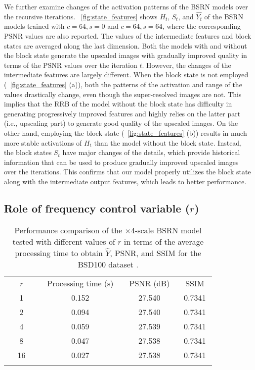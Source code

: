 \documentclass[runningheads]{llncs}
\begin{document}
We further examine changes of the activation patterns of the BSRN models over the recursive iterations.
\figurename~\ref{fig:state_features} shows ${H}_{t}$, ${S}_{t}$, and $\widehat{{Y}_{t}}$ of the BSRN models trained with $c=64, s=0$ and $c=64, s=64$, where the corresponding PSNR values are also reported.
The values of the intermediate features and block states are averaged along the last dimension.
Both the models with and without the block state generate the upscaled images with gradually improved quality in terms of the PSNR values over the iteration $t$.
However, the changes of the intermediate features are largely different.
When the block state is not employed (\figurename~\ref{fig:state_features} (a)), both the patterns of the activation and range of the values drastically change, even though the super-resolved images are not.
This implies that the RRB of the model without the block state has difficulty in generating progressively improved features and highly relies on the latter part (i.e., upscaling part) to generate good quality of the upscaled images.
On the other hand, employing the block state (\figurename~\ref{fig:state_features} (b)) results in much more stable activations of ${H}_{t}$ than the model without the block state.
Instead, the block states ${S}_{t}$ have major changes of the details, which provide historical information that can be used to produce gradually improved upscaled images over the iterations.
This confirms that our model properly utilizes the block state along with the intermediate output features, which leads to better performance.


\subsection{Role of frequency control variable ($r$)}
\label{sec:r_role}

\begin{table}[t]
	\scriptsize
	\begin{center}
		\begin{tabular}{c c c c}
			\noalign{\smallskip}
			\hline
			\noalign{\smallskip}
			~~~$r$~~~ & ~Processing time (s)~ & ~PSNR (dB)~ & ~SSIM~ \\
			\noalign{\smallskip}
			\hline
			\noalign{\smallskip}
			1 & 0.152 & 27.540 & 0.7341 \\
			2 & 0.094 & 27.540 & 0.7341 \\
			4 & 0.059 & 27.539 & 0.7341 \\
			8 & 0.047 & 27.538 & 0.7341 \\
			16 & 0.027 & 27.538 & 0.7341 \\
			\noalign{\smallskip}
			\hline
			\noalign{\smallskip}
		\end{tabular}
	\end{center}
	\caption{Performance comparison of the $\times$4-scale BSRN model tested with different values of $r$ in terms of the average processing time to obtain $\widehat{Y}$, PSNR, and SSIM for the BSD100 dataset \cite{martin2001database}.}
	\label{table:frequency_control_speed}
\end{table}
\end{document}
